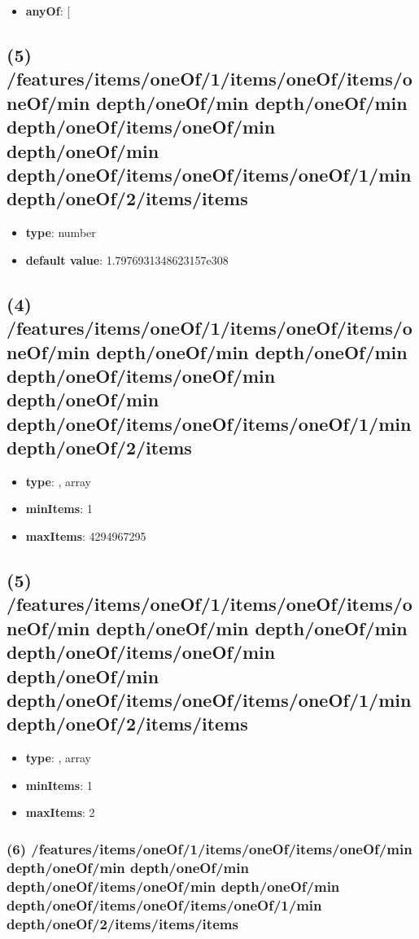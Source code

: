 \begin{itemize}[leftmargin=5em]\item {\bf anyOf}: [\end{itemize}\subsection{(5) /features/items/oneOf/1/items/oneOf/items/oneOf/min depth/oneOf/min depth/oneOf/min depth/oneOf/items/oneOf/min depth/oneOf/min depth/oneOf/items/oneOf/items/oneOf/1/min depth/oneOf/2/items/items}
\begin{itemize}[leftmargin=5em]\item {\bf type}: number\item {\bf default value}: 1.7976931348623157e308
\end{itemize}\subsection{(4) /features/items/oneOf/1/items/oneOf/items/oneOf/min depth/oneOf/min depth/oneOf/min depth/oneOf/items/oneOf/min depth/oneOf/min depth/oneOf/items/oneOf/items/oneOf/1/min depth/oneOf/2/items}
\begin{itemize}[leftmargin=4em]\item {\bf type}: , array\item {\bf minItems}: 1
\item {\bf maxItems}: 4294967295
\end{itemize}\subsection{(5) /features/items/oneOf/1/items/oneOf/items/oneOf/min depth/oneOf/min depth/oneOf/min depth/oneOf/items/oneOf/min depth/oneOf/min depth/oneOf/items/oneOf/items/oneOf/1/min depth/oneOf/2/items/items}
\begin{itemize}[leftmargin=5em]\item {\bf type}: , array\item {\bf minItems}: 1
\item {\bf maxItems}: 2
\end{itemize}\subsubsection{(6) /features/items/oneOf/1/items/oneOf/items/oneOf/min depth/oneOf/min depth/oneOf/min depth/oneOf/items/oneOf/min depth/oneOf/min depth/oneOf/items/oneOf/items/oneOf/1/min depth/oneOf/2/items/items/items}
